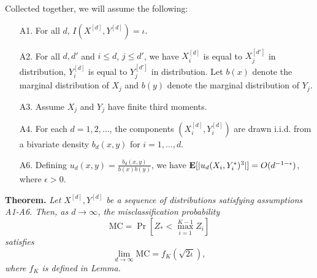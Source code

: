 \documentclass[12pt]{article}
\begin{document}
Collected together, we will assume the following:
\begin{itemize}
\item[A1. ] For all $d$, $I(X^{[d]}, Y^{[d]}) = \iota$.
\item[A2. ] For all $d, d'$ and $i \leq d$, $j \leq d'$, we have $X_i^{[d]}$ is equal to $X_j^{[d']}$ in distribution,
$Y_i^{[d]}$ is equal to $Y_j^{[d']}$ in distribution.  Let $b(x)$
denote the marginal distribution of $X_j$ and $b(y)$ denote the
marginal distribution of $Y_j$.
\item[A3. ] Assume $X_j$ and $Y_j$ have finite third moments.
\item[A4. ] For each $d = 1,2,\hdots$, the components $(X_i^{[d]}, Y_i^{[d]})$ are drawn i.i.d. from a bivariate density
$b_d(x, y)$ for $i = 1,\hdots, d$.
\item[A6. ] Defining $u_d(x, y) = \frac{b_d(x, y)}{b(x)b(y)}$,
we have $\textbf{E}[|u_d(X_i, Y_i^*)^3|] = O(d^{-1 - \epsilon})$, where
$\epsilon > 0$.
\end{itemize}

\textbf{Theorem. }  
\emph{
Let $X^{[d]}, Y^{[d]}$ be a sequence of distributions satisfying
assumptions A1-A6.  Then, as $d \to \infty$, the misclassification
probability
\[
\text{MC} = \Pr[Z_* < \max_{i=1}^{K-1} Z_i]
\]
satisfies
\[
\lim_{d \to \infty} \text{MC} = f_K(\sqrt{2\iota}),
\]
where $f_K$ is defined in Lemma.
}
\end{document}
